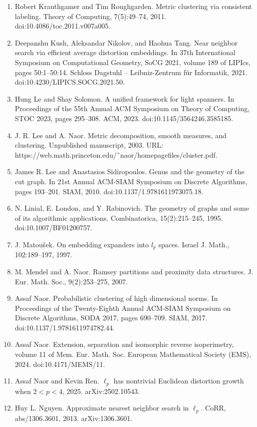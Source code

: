 \documentclass[10pt,a4paper]{amsart}
\begin{document}
\begin{enumerate}
\item  [32]  Robert Krauthgamer and Tim Roughgarden.  Metric clustering via consistent labeling.  Theory of Computing, 7(5):49–74, 2011.  doi:10.4086/toc.2011.v007a005.  
\item  [33]  Deepanshu Kush, Aleksandar Nikolov, and Haohua Tang.  Near neighbor search via efficient average distortion embeddings.  In 37th International Symposium on Computational Geometry, SoCG 2021, volume 189 of LIPIcs, pages 50:1–50:14. Schloss Dagstuhl – Leibniz-Zentrum für Informatik, 2021.  doi:10.4230/LIPICS.SOCG.2021.50.  
\item  [34]  Hung Le and Shay Solomon.  A unified framework for light spanners.  In Proceedings of the 55th Annual ACM Symposium on Theory of Computing, STOC 2023, pages 295–308. ACM, 2023.  doi:10.1145/3564246.3585185.  
\item  [35]  J. R. Lee and A. Naor.  Metric decomposition, smooth measures, and clustering.  Unpublished manuscript, 2003.  URL: https://web.math.princeton.edu/˜naor/homepagefiles/cluster.pdf.  
\item  [36]  James R. Lee and Anastasios Sidiropoulos.  Genus and the geometry of the cut graph.  In 21st Annual ACM-SIAM Symposium on Discrete Algorithms, pages 193–201. SIAM, 2010.  doi:10.1137/1.9781611973075.18.  
\item  [37]  N. Linial, E. London, and Y. Rabinovich.  The geometry of graphs and some of its algorithmic applications.  Combinatorica, 15(2):215–245, 1995.  doi:10.1007/BF01200757.  
\item  [38]  J. Matoušek.  On embedding expanders into $l_{p}$ spaces.  Israel J. Math., 102:189–197, 1997.  
\item  [39]  M. Mendel and A. Naor.  Ramsey partitions and proximity data structures.  J. Eur. Math. Soc., 9(2):253–275, 2007.  
\item  [40]  Assaf Naor.  Probabilistic clustering of high dimensional norms.  In Proceedings of the Twenty-Eighth Annual ACM-SIAM Symposium on Discrete Algorithms, SODA 2017, pages 690–709. SIAM, 2017.  doi:10.1137/1.9781611974782.44.  
\item  [41]  Assaf Naor.  Extension, separation and isomorphic reverse isoperimetry, volume 11 of Mem. Eur. Math. Soc.  European Mathematical Society (EMS), 2024.  doi:10.4171/MEMS/11.  
\item  [42]  Assaf Naor and Kevin Ren.  $\ell_{p}$ has nontrivial Euclidean distortion growth when $2<p<4$, 2025.  arXiv:2502.10543.  
\item  [43]  Huy L. Nguyen.  Approximate nearest neighbor search in $\ell_{p}$.  CoRR, abs/1306.3601, 2013.  arXiv:1306.3601.  

\end{enumerate}
\end{document}
